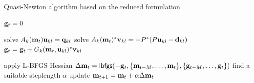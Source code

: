 \documentclass{iopart}
\begin{document}
\begin{algorithm}
\caption{Quasi-Newton algorithm based on the reduced formulation}
\label{QN2}
\begin{algorithmic}
\STATE $\mathbf{g}_t = 0$

\STATE solve $A_k(\mathbf{m}_t)\mathbf{u}_{kl} =\mathbf{q}_{kl}$
\STATE solve $A_k(\mathbf{m}_t)^*\mathbf{v}_{kl} = -P^*(P\mathbf{u}_{kl} - \mathbf{d}_{kl})$
\STATE $\mathbf{g}_t = \mathbf{g}_t  + G_k(\mathbf{m}_t, \mathbf{u}_{kl})^*\mathbf{v}_{kl}$
\ENDFOR

\ENDFOR

\STATE apply L-BFGS Hessian $\Delta \mathbf{m}_t = \mathsf{lbfgs}(-\mathbf{g}_t,\{\mathbf{m}_{t-M}, \ldots, \mathbf{m}_t\},\{\mathbf{g}_{t-M}, \ldots, \mathbf{g}_t\})$
\STATE find a suitable steplength $\alpha$ 
\STATE update $\mathbf{m}_{t+1} = \mathbf{m}_t + \alpha\Delta \mathbf{m}_t$
\ENDFOR
\end{algorithmic}
\end{algorithm}


\clearpage
\end{document}
